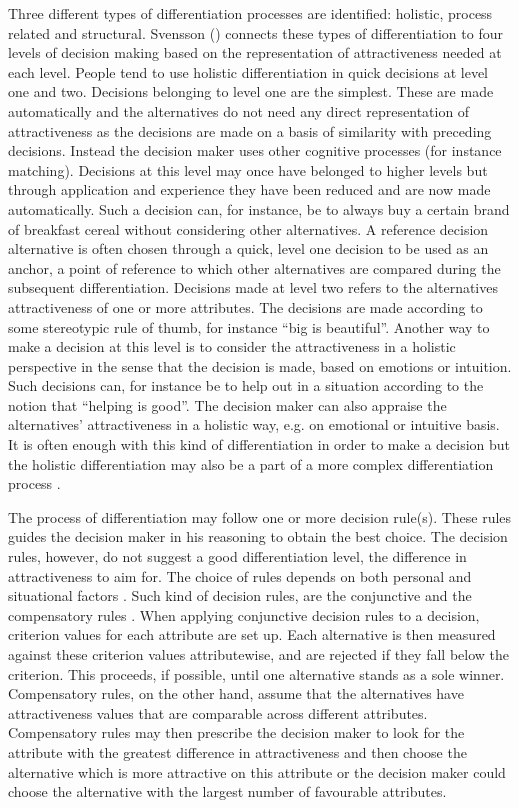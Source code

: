 Three different types of differentiation processes are identified:
holistic, process related and structural.  Svensson
(\citeyear{svensson92b}) connects these types of differentiation to
four levels of decision making based on the representation of
attractiveness needed at each level.  People tend to use holistic
differentiation in quick decisions at level one and two.   Decisions
belonging to level one are the simplest.  These are made automatically
and the alternatives do not need any direct representation of
attractiveness as the decisions are made on a basis of similarity with
preceding decisions.  Instead the decision maker uses other cognitive
processes (for instance matching).  Decisions at this level may once
have belonged to higher levels but through application and experience
they have been reduced and are now made automatically.  Such a
decision can, for instance, be to always buy a certain brand of
breakfast cereal without considering other alternatives.  A reference
decision alternative is often chosen through a quick, level one
decision to be used as an anchor, a point of reference to which other
alternatives are compared during the subsequent differentiation.
Decisions made at level two refers to the alternatives attractiveness
of one or more attributes.  The decisions are made according to some
stereotypic rule of thumb, for instance ``big is beautiful''.  Another
way to make a decision at this level is to consider the attractiveness
in a holistic perspective in the sense that the decision is made,
based on emotions or intuition.  Such decisions can, for instance be
to help out in a situation according to the notion that ``helping is
good''.  The decision maker can also appraise the alternatives'
attractiveness in a holistic way, e.g. on emotional or intuitive
basis.  It is often enough with this kind of differentiation in order
to make a decision but the holistic differentiation may also be a part
of a more complex differentiation process \parencite{svensson92b,
  Svensson96}.

The process of differentiation may follow one or more decision
rule(s).  These rules guides the decision maker in his reasoning to
obtain the best choice.  The decision rules, however, do not suggest a
good differentiation level, the difference in attractiveness to aim
for.  The choice of rules depends on both personal and situational
factors \parencite{svensson92b}.  Such kind of decision rules, are the
conjunctive and the compensatory rules \parencite{Svensson96}.  When
applying conjunctive decision rules to a decision, criterion values
for each attribute are set up.  Each alternative is then measured
against these criterion values attributewise, and are rejected if they
fall below the criterion.  This proceeds, if possible, until one
alternative stands as a sole winner.  Compensatory rules, on the other
hand, assume that the alternatives have attractiveness values that are
comparable across different attributes.  Compensatory rules may then
prescribe the decision maker to look for the attribute with the
greatest difference in attractiveness and then choose the alternative
which is more attractive on this attribute or the decision maker could
choose the alternative with the largest number of favourable
attributes.

